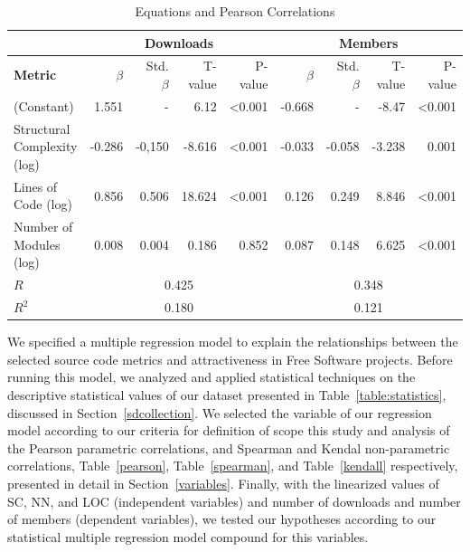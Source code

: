\documentclass[conference]{IEEEtran}
\begin{document}
\begin{center}
\begin{table}[hbt]
\centering \caption{Equations and Pearson Correlations}
\begin{tabular}{|l|r|r|r|r|r|r|r|r|} \hline

& \multicolumn{4}{|c|}{Downloads} & \multicolumn{4}{|c|}{Members}\\ \hline
  
\textbf{Metric} & $\beta$ & Std. $\beta$ & T-value & P-value & $\beta$ & Std. $\beta$ & T-value & P-value
\\ \hline
(Constant) & 1.551 & - & 6.12 & \textless 0.001 & -0.668 & - & -8.47 & \textless 0.001
\\ \hline
Structural Complexity (log) & -0.286 & -0,150 & -8.616 & \textless 0.001 & -0.033 & -0.058 & -3.238 & 0.001
\\ \hline
Lines of Code (log) & 0.856 & 0.506 & 18.624 & \textless 0.001 & 0.126 & 0.249 & 8.846 & \textless 0.001
\\ \hline
Number of Modules (log) & 0.008 & 0.004 & 0.186 & 0.852 & 0.087 & 0.148 & 6.625 & \textless 0.001
\\ \hline
   \hline
$R$ & \multicolumn{4}{|c|}{0.425} & \multicolumn{4}{|c|}{0.348}\\ \hline
$R^2$ & \multicolumn{4}{|c|}{0.180} & \multicolumn{4}{|c|}{0.121}\\ \hline
\end{tabular}
\label{table:regression}
\end{table}
\end{center}

We specified a multiple regression model to explain the relationships 
between the selected source code metrics and attractiveness in Free Software projects.
%
Before running this model, we analyzed and applied statistical techniques 
on the descriptive statistical values of our dataset presented in
Table~\ref{table:statistics}, discussed in Section~\ref{sdcollection}.
%
We selected the variable of our regression model according to our criteria for
definition of scope this study and analysis of the Pearson parametric
correlations, and Spearman and Kendal non-parametric correlations,
Table~\ref{pearson}, Table~\ref{spearman}, and Table~\ref{kendall} respectively,
presented in detail in Section~\ref{variables}.
Finally, with the linearized values of SC, NN, and LOC (independent variables) 
and number of downloads and number of members (dependent variables), we tested 
our hypotheses according to our statistical multiple regression model compound
for this variables.
\end{document}
